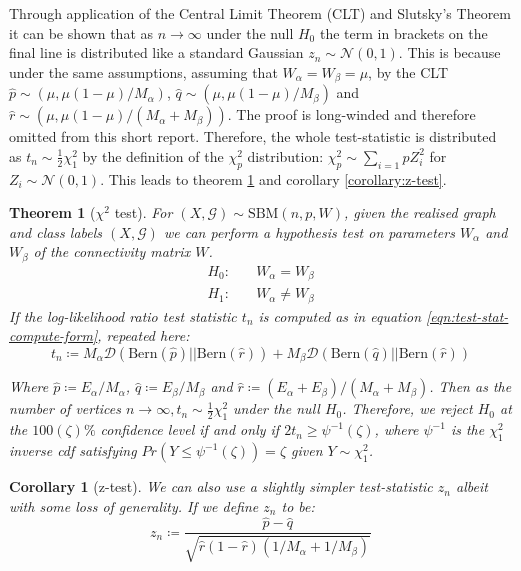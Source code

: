 \documentclass[]{article}
\newcommand{\Gaussian}{\mathcal{N}}
\newcommand{\Gcal}{\mathcal{G}}
\newcommand{\kl}{\mathcal{D}}
\newtheorem{theorem}{Theorem}[section]
\newtheorem{corollary}{Corollary}[theorem]
\begin{document}
\begin{multicols*}{2}
Through application of the Central Limit Theorem (CLT) and Slutsky's Theorem it can be shown that as $n \rightarrow \infty$ under the null $H_0$ the term in brackets on the final line is distributed like a standard Gaussian $z_n \sim \Gaussian(0,1)$. This is because under the same assumptions, assuming that $W_\alpha = W_\beta = \mu$, by the CLT $\hat{p} \sim (\mu, \mu(1 - \mu)/ M_\alpha)$, $\hat{q} \sim (\mu, \mu(1 - \mu)/ M_\beta)$ and $\hat{r} \sim (\mu, \mu(1 - \mu)/ (M_\alpha + M_\beta))$. The proof is long-winded and therefore omitted from this short report. Therefore, the whole test-statistic is distributed as $t_n \sim \frac{1}{2} \chi^2_1$ by the definition of the $\chi^2_p$ distribution: $\chi^2_p \sim \sum_{i=1}{p} Z_i^2$ for $Z_i \sim \Gaussian(0,1)$. This leads to theorem \ref{theorem:hyp-test-sbm-chi} and corollary \ref{corollary:z-test}.

\begin{theorem}[$\chi^2$ test]
	For $(X, \Gcal) \sim \textrm{SBM}(n, p, W)$, given the realised graph and class labels $(X, \Gcal)$ we can perform a hypothesis test on parameters $W_\alpha$ and $W_\beta$ of the connectivity matrix $W$.
	\begin{align*}
	H_0:& \quad W_{\alpha} = W_{\beta} \\
	H_1:& \quad W_{\alpha} \neq W_{\beta}
	\end{align*}
	If the log-likelihood ratio test statistic $t_n$ is computed as in equation \ref{eqn:test-stat-compute-form}, repeated here:
	\begin{equation*}
		t_n \coloneqq  M_\alpha \kl\left( \textrm{Bern}(\hat{p}) || \textrm{Bern}(\hat{r})\right) + 
		M_\beta \kl\left( \textrm{Bern}(\hat{q}) || \textrm{Bern}(\hat{r})\right)
	\end{equation*}
	
	Where $\hat{p} \coloneqq E_\alpha / M_\alpha$, $\hat{q} \coloneqq E_\beta / M_\beta$ and $\hat{r} \coloneqq (E_\alpha + E_\beta) / (M_\alpha + M_\beta)$. Then as the number of vertices $n \rightarrow \infty, t_n \sim \frac{1}{2} \chi^2_1$ under the null $H_0$. Therefore, we reject $H_0$ at the $100(\zeta)\%$ confidence level if and only if $2t_n \geq \psi^{-1}(\zeta)$, where $\psi^{-1}$ is the $\chi^2_1$ inverse cdf satisfying $Pr(Y \leq \psi^{-1}(\zeta)) = \zeta$ given $Y \sim \chi^2_1$.
	
	\label{theorem:hyp-test-sbm-chi}
\end{theorem}

\begin{corollary}[z-test]
	We can also use a slightly simpler test-statistic $z_n$ albeit with some loss of generality. If we define $z_n$ to be:
	\begin{equation*}
		z_n \coloneqq \frac{\hat{p} - \hat{q}}{\sqrt{\hat{r}(1- \hat{r})(1/M_\alpha + 1/M_\beta)}}
	\end{equation*}
	

\end{corollary}
\end{multicols*}
\end{document}
